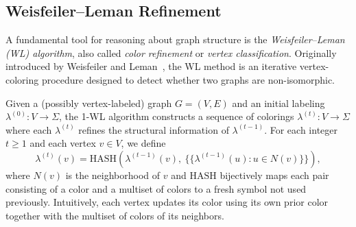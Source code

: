 




\subsection{Weisfeiler--Leman Refinement}

A fundamental tool for reasoning about graph structure is the \emph{Weisfeiler--Leman (WL) algorithm}, also called \emph{color refinement} or \emph{vertex classification}. Originally introduced by Weisfeiler and Leman~\citep{Weisfeiler:1968ve}, the WL method is an iterative vertex-coloring procedure designed to detect whether two graphs are non-isomorphic. 

Given a (possibly vertex-labeled) graph $G = (V,E)$ and an initial labeling $\lambda^{(0)} : V \to \Sigma$, the 1-WL algorithm constructs a sequence of colorings $\lambda^{(t)} : V \to \Sigma$ where each $\lambda^{(t)}$ refines the structural information of $\lambda^{(t-1)}$. For each integer $t \ge 1$ and each vertex $v \in V$, we define
\[
\lambda^{(t)}(v)
    = \mathrm{HASH}\!\left(
        \lambda^{(t-1)}(v),~
        \big\{\!\!\{\lambda^{(t-1)}(u) : u \in N(v)\}\!\!\}
    \right),
\]
where $N(v)$ is the neighborhood of $v$ and $\mathrm{HASH}$ bijectively maps each pair consisting of a color and a multiset of colors to a fresh symbol not used previously. Intuitively, each vertex updates its color using its own prior color together with the multiset of colors of its neighbors.

